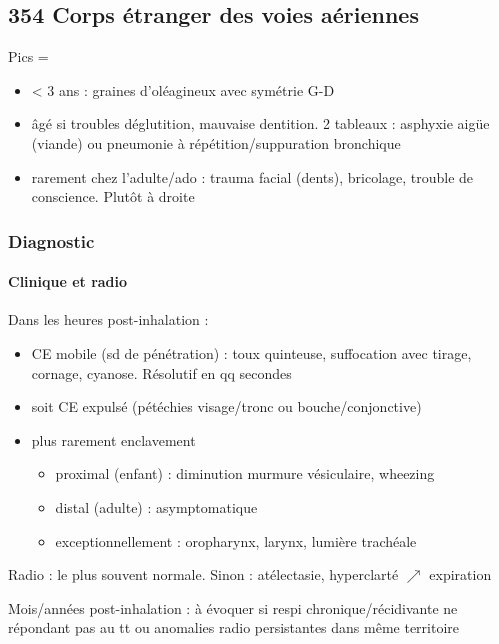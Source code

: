 \documentclass[11pt]{article}
\begin{document}
\subsection{354 \textdagger{} Corps étranger des voies aériennes}
\label{sec:org28ffcd7}
\label{sec:354_corps_etranger_des_voies_aeriennes}

Pics = 

\begin{itemize}
\item < 3 ans : graines d'oléagineux avec symétrie G-D
\item âgé si troubles déglutition, mauvaise dentition. 2 tableaux : asphyxie
aigüe (viande) ou pneumonie à répétition/suppuration bronchique
\item rarement chez l'adulte/ado : trauma facial (dents), bricolage, trouble
de conscience. Plutôt à droite
\end{itemize}


\subsubsection{Diagnostic}
\label{sec:orgd9c8913}
\paragraph{Clinique et radio}
\label{sec:org72836ca}
Dans les heures post-inhalation :

\begin{itemize}
\item CE mobile (sd de pénétration) : toux quinteuse, suffocation avec tirage,
cornage, cyanose. Résolutif en qq secondes
\item soit CE expulsé (pétéchies visage/tronc ou bouche/conjonctive)
\item plus rarement enclavement 

\begin{itemize}
\item proximal (enfant) : diminution murmure vésiculaire, wheezing
\item distal (adulte) : asymptomatique
\item exceptionnellement : oropharynx, larynx, lumière trachéale
\end{itemize}
\end{itemize}


Radio : le plus souvent normale. Sinon : atélectasie, hyperclarté \(\nearrow\)
expiration

Mois/années post-inhalation : à évoquer si respi chronique/récidivante ne
répondant pas au tt ou anomalies radio persistantes dans même territoire
\end{document}
